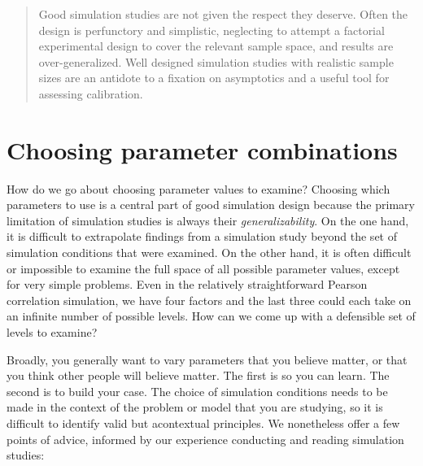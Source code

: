 \documentclass[
]{book}
\begin{document}
\begin{quote}
Good simulation studies are not given the respect they deserve. Often the design is perfunctory and simplistic, neglecting to attempt a factorial experimental design to cover the relevant sample space, and results are over-generalized. Well designed simulation studies with realistic sample sizes are an antidote to a ﬁxation on asymptotics and a useful tool for assessing calibration.
\end{quote}

\section{Choosing parameter combinations}\label{choosing-parameter-combinations}

How do we go about choosing parameter values to examine?
Choosing which parameters to use is a central part of good simulation design because the primary limitation of simulation studies is always their \emph{generalizability}.
On the one hand, it is difficult to extrapolate findings from a simulation study beyond the set of simulation conditions that were examined. On the other hand, it is often difficult or impossible to examine the full space of all possible parameter values, except for very simple problems.
Even in the relatively straightforward Pearson correlation simulation, we have four factors and the last three could each take on an infinite number of possible levels.
How can we come up with a defensible set of levels to examine?

Broadly, you generally want to vary parameters that you believe matter, or that you think other people will believe matter.
The first is so you can learn.
The second is to build your case.
The choice of simulation conditions needs to be made in the context of the problem or model that you are studying, so it is difficult to identify valid but acontextual principles.
We nonetheless offer a few points of advice, informed by our experience conducting and reading simulation studies:
\end{document}
